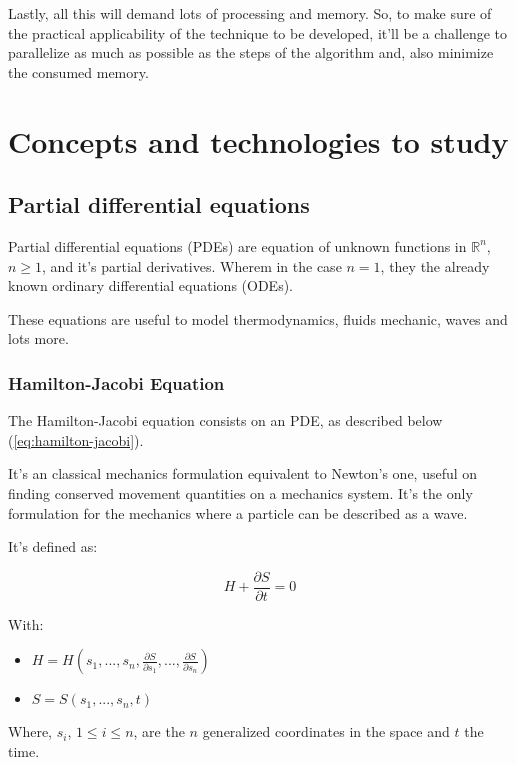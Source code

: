 \documentclass[a4paper,11pt]{report}
\begin{document}
  Lastly, all this will demand lots of processing and memory. So, to make sure of the practical applicability of the technique to be developed, it'll be a challenge to parallelize as much as possible as the steps of the algorithm and, also minimize the consumed memory.

\chapter{Concepts and technologies to study}
  \section{Partial differential equations}
  Partial differential equations (PDEs) are equation of unknown functions in $\mathbb{R}^{n}$, $n \geq 1$, and it's partial derivatives. Wherem in the case $n = 1$, they the already known ordinary differential equations (ODEs).

  These equations are useful to model thermodynamics, fluids mechanic, waves and lots more.

    \subsection{Hamilton-Jacobi Equation}
    The Hamilton-Jacobi equation consists on an PDE, as described below (\ref{eq:hamilton-jacobi}).

    It's an classical mechanics formulation equivalent to Newton's one, useful on finding conserved movement quantities on a mechanics system. It's the only formulation for the mechanics where a particle can be described as a wave.

    It's defined as:

    \begin{equation} \label{eq:hamilton-jacobi}
      H + \frac{\partial S}{\partial t} = 0
    \end{equation}
    
    With:
    
    \begin{itemize}
      \item $H = H(s_{1}, ..., s_{n}, \frac{\partial S}{\partial s_{1}}, ..., \frac{\partial S}{\partial s_{n}})$
      \item $S = S(s_{1}, ..., s_{n}, t)$
    \end{itemize}
    
    Where, $s_{i}$, $1 \leq i \leq n$, are the $n$ generalized coordinates in the space and $t$ the time.
\end{document}
